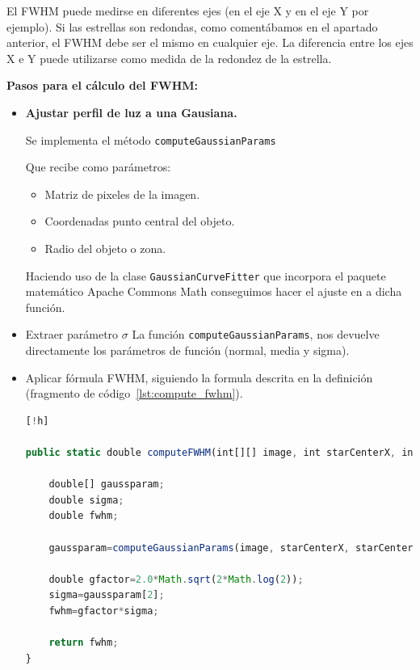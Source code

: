 El FWHM puede medirse en diferentes ejes (en el eje X y en el eje Y por ejemplo).
Si las estrellas son redondas, como comentábamos en el apartado anterior, el FWHM debe ser el mismo en cualquier eje.
La diferencia entre los ejes X e Y puede utilizarse como medida de la redondez de la estrella.


\textbf{Pasos para el cálculo del FWHM:}
\begin{itemize}
	\item \textbf{Ajustar perfil de luz a una Gausiana.}
	
	Se implementa el método \texttt{computeGaussianParams}
	
	Que recibe como parámetros:
	
	\begin{itemize}
		\item Matriz de pixeles de la imagen.
		\item Coordenadas punto central del objeto.
		\item Radio del objeto o zona. 
	\end{itemize} 
	
	Haciendo uso de la clase \texttt{GaussianCurveFitter} \cite{gaussian_curve_fitter} que incorpora el paquete matemático Apache Commons Math \cite{apache_math} conseguimos hacer el ajuste en a dicha función. 
		
	\item Extraer parámetro $ \sigma $  La función \texttt{computeGaussianParams}, nos devuelve directamente los parámetros de función (normal, media y sigma).
		
	\item Aplicar fórmula FWHM, siguiendo la formula descrita en la definición (fragmento de código~\ref{lst:compute_fwhm}).
		
	
	\begin{lstlisting}[language=javascript, caption={Cálculo FWHM},label={lst:compute_fwhm}][!h]
	 
public static double computeFWHM(int[][] image, int starCenterX, int starCenterY, int radius ) {
    
    double[] gaussparam;
    double sigma;
    double fwhm;
    
    gaussparam=computeGaussianParams(image, starCenterX, starCenterY, radius);
    
    double gfactor=2.0*Math.sqrt(2*Math.log(2));
    sigma=gaussparam[2];
    fwhm=gfactor*sigma;
    
    return fwhm;
}
	   
	\end{lstlisting}
	
	
\end{itemize}





